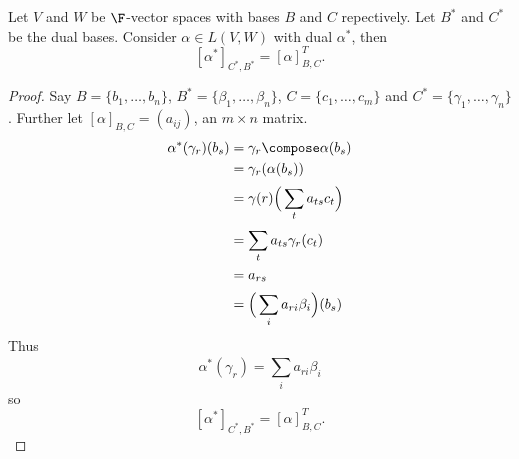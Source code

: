 \documentclass[a4paper]{article}
\theoremstyle{definition}
\begin{document}
\begin{prop}
  Let \(V\) and \(W\) be \(\F\)-vector spaces with bases \(B\) and \(C\) repectively. Let \(B^*\) and \(C^*\) be the dual bases. Consider \(\alpha\in L(V,W)\) with dual \(\alpha^*\), then
  \[
    [\alpha^*]_{C^*,B^*} = [\alpha]^T_{B,C}.
  \]
\end{prop}

\begin{proof}
  Say \(B = \{b_1,\dots,b_n\}\), \(B^* = \{\beta_1,\dots,\beta_n\}\), \(C = \{c_1,\dots,c_m\}\) and \(C^* = \{\gamma_1,\dots,\gamma_n\}\). Further let \([\alpha]_{B,C} = (a_{ij})\), an \(m\times n\) matrix.
  \begin{align*}
    \alpha^*(\gamma_r)(b_s) &= \gamma_r \compose \alpha(b_s) \\
                            &= \gamma_r(\alpha(b_s)) \\
                            &= \gamma(r) \Big( \sum_{t}^{ }a_{ts}c_t \Big) \\
                            &= \sum_{t}^{ } a_{ts} \gamma_r(c_t) \\
                            &= a_{rs} \\
                            &= \Big( \sum_{i}^{ } a_{ri}\beta_i \Big) (b_s)
  \end{align*}
  Thus
  \[
    \alpha^*(\gamma_r) = \sum_{i}^{ } a_{ri}\beta_i
  \]
  so
  \[
    [\alpha^*]_{C^*,B^*} = [\alpha]^T_{B,C}.
  \]
\end{proof}
\end{document}
